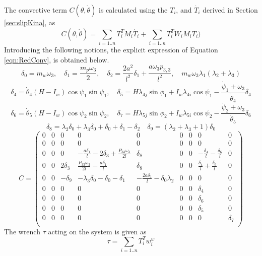 The convective term $C(\theta,\dot{\theta})$ is calculated using the $T_i$, and $\dot{T_i}$ derived in Section \ref{sec:slipKina}, as
\begin{equation}
\label{eqn:RedConv}
C(\theta,\dot{\theta})=\sum_{i=1..n}T_i^T M_i\dot{T_i}+ \sum_{i=1..n}T_i^T W_i M_i T_i)\end{equation}
Introducing the following notions, the explicit expression of Equation \ref{eqn:RedConv}, is obtained below. 
\[ \delta_0=m_w\omega_3, \quad \delta_1= \frac{m_p \omega_3}{2}, \quad \delta_2=\frac{2a^2}{l^2}\delta_1+\frac{a \omega_3 p_{3,3}}{l^2}, \quad m_w\omega_3 \lambda_1(\lambda_2+\lambda_3)\]
\[ \delta_4 = \dot\theta_4 (H-I_w)\cos{\psi_1}\sin{\psi_1},\quad \delta_5=H\lambda_{4j}\sin{\phi_1}+I_w \lambda_{4i}\cos{\psi_1}-\frac{\dot \psi_1+\omega_3}{\dot\theta_4}\delta_4  \]
\[ \delta_6 = \dot\theta_5 (H-I_w)\cos{\psi_2}\sin{\psi_2},\quad \delta_7=H\lambda_{5j}\sin{\phi_2}+I_w \lambda_{5i}\cos{\psi_2}-\frac{\dot \psi_2+\omega_3}{\dot\theta_5}\delta_6  \]
\[\delta_8=\lambda _2 \delta _0+\lambda _3 \delta _0+\delta _0+\delta _1-\delta _2 \quad \delta_9=(\lambda _2+\lambda _3 +1)\delta _0  \]
\[ C=
\left(
\begin{array}{ccccccccc}
 0 & 0 & 0 & 0 & 0 & 0 & 0 & 0 & 0 \\
 0 & 0 & 0 & 0 & 0 & 0 & 0 & 0 & 0 \\
 0 & 0 & 0 & -\frac{a \delta _1}{l}-2 \delta _3+\frac{P_{33} \omega _3}{2 l} & \delta_8 & 0 & 0 & -\frac{\delta _4}{l}-\frac{\delta _6}{l} & 0 \\
 0 & 0 & 2 \delta _3 & \frac{P_{33} \omega _3}{2 l}-\frac{a \delta _1}{l} & \delta_8 & 0 & 0 & \frac{\delta _4}{l}+\frac{\delta _6}{l} & 0 \\
 0 & 0 & -\delta_9& -\lambda _3 \delta _0-\delta _0-\delta _1 & -\frac{2 a \delta _1}{l}-\delta _0 \lambda _2 & 0 & 0 & 0 & 0 \\
 0 & 0 & 0 & 0 & 0 & 0 & 0 & \delta _4 & 0 \\
 0 & 0 & 0 & 0 & 0 & 0 & 0 & \delta _6 & 0 \\
 0 & 0 & 0 & 0 & 0 & 0 & 0 & \delta _5 & 0 \\
 0 & 0 & 0 & 0 & 0 & 0 & 0 & 0 & \delta _7 \\
\end{array}
\right)\]
The wrench $\tau$ acting on the system is given as 
\begin{equation}
\label{eqn:slipTauSum}
\tau=\sum_{i=1..n}T_i^T w^w_i
\end{equation}
